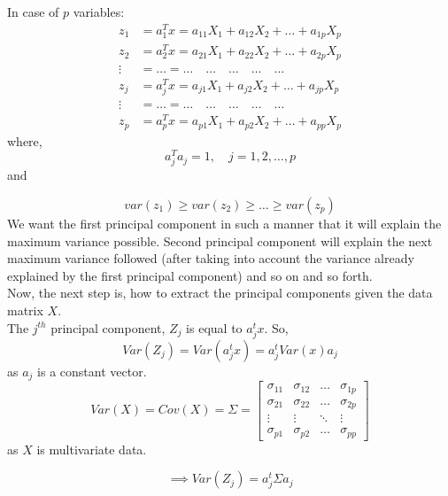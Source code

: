 \documentclass[12pt,a4paper]{report}
\begin{document}
In case of $p$ variables:
\begin{align}
z_1 &= a_1^T x = a_{11}X_1 + a_{12}X_2 + \dots + a_{1p}X_p \\
z_2 &= a_2^T x = a_{21}X_1 + a_{22}X_2 + \dots + a_{2p}X_p \\
\vdots &= \dots = \dots \quad  \dots \quad \dots \quad \dots \quad \dots   \\
z_j &= a_j^T x = a_{j1}X_1 + a_{j2}X_2 + \dots + a_{jp}X_p \\
\vdots &= \dots = \dots \quad  \dots \quad \dots \quad \dots \quad \dots  \\
z_p &= a_p^T x = a_{p1}X_1 + a_{p2}X_2 + \dots + a_{pp}X_p 
\end{align}
where,
\begin{equation}
a_j^T a_j = 1, \quad j = 1,2, \dots, p
\end{equation}
and 

\begin{equation}
var(z_1) \geq var(z_2) \geq \dots \geq var(z_p) 
\end{equation}
We want the first principal component in such a manner that it will explain the maximum variance possible. Second principal component will explain the next maximum variance followed (after taking into account the variance already explained by the first principal component) and so on and so forth. \\
Now, the next step is, how to extract the principal components given the data matrix $X$. \\
The $j^{th}$ principal component, $Z_j$ is equal to $a_j^t x$. So,
\begin{equation}
Var(Z_j) = Var(a_j^t x) =a_j^t Var( x) a_j
\end{equation}
as $a_j$ is a constant vector.
\begin{equation}
Var(X) = Cov(X) = \Sigma = 
\begin{bmatrix}
    \sigma_{11} & \sigma_{12} & \dots  & \sigma_{1p} \\
    \sigma_{21} & \sigma_{22} & \dots  & \sigma_{2p} \\
    \vdots & \vdots & \ddots & \vdots \\
    \sigma_{p1} & \sigma_{p2} & \dots  & \sigma_{pp}
\end{bmatrix}

\end{equation}
as $X$ is multivariate data.

\begin{equation}
\implies Var(Z_j) = a_j^t \Sigma a_j
\end{equation}
\end{document}
